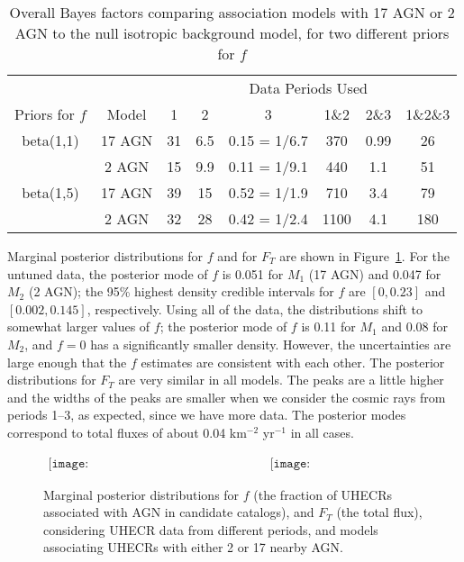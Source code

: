 \begin{table}
\begin{tabular}{|c|c|c |c| c| c| c| c|}
\hline
& & \multicolumn{6}{|c|}{Data Periods Used}\\
\cline{3-8}
 Priors for $f$ & Model & 1 &  2 &  3 &  1\&2 & 2\&3 &  1\&2\&3\\
\hline
beta(1,1) & 17 AGN & 31 & 6.5 & 0.15 = 1/6.7 & 370 & 0.99 & 26\\
 & 2 AGN  & 15 & 9.9 & 0.11 = 1/9.1 & 440 & 1.1 & 51\\
\hline
beta(1,5) & 17 AGN & 39 & 15 & 0.52 = 1/1.9 & 710 & 3.4 & 79\\
 & 2 AGN  & 32 & 28 & 0.42 = 1/2.4 & 1100 & 4.1 & 180\\
\hline
\end{tabular}
\caption{Overall Bayes factors comparing association models with 17 AGN or
2 AGN to the null isotropic background model, for two different priors for
$f$}\label{tab:BFtab}
\label{BFTable}
\end{table}


Marginal posterior distributions for $f$ and for $F_T$ are shown in
Figure~\ref{fig:posterior}.  For the untuned data, the posterior mode of
$f$ is 0.051 for $M_1$ (17 AGN) and 0.047 for $M_2$ (2 AGN);
the 95\% highest density credible intervals for $f$ are $[0, 0.23]$
and $[0.002, 0.145]$, respectively.  Using all of the data, the
distributions shift to somewhat larger values of $f$; the
posterior mode of $f$ is 0.11 for $M_1$ and 0.08 for $M_2$, and $f=0$
has a significantly smaller density.  However, the uncertainties are
large enough that the $f$ estimates are consistent with each other.  The
posterior distributions for $F_T$ are very similar in all models.  The
peaks are a little higher and the widths of the peaks are smaller when
we consider the cosmic rays from periods 1--3, as expected, since we
have more data.  The posterior modes correspond to total fluxes of about
0.04 km$^{-2}$ yr$^{-1}$ in all cases.

\begin{figure}
\centerline{$
\begin{array}{cc}
\texttt{[image: posterior\_f\_all\_margOverKappa.eps]} &
\texttt{[image: posterior\_FT\_all\_margOverKappa.eps]}
\end{array}$}
\caption{Marginal posterior distributions for $f$ (the fraction of
UHECRs associated with AGN in candidate catalogs), and $F_T$ (the total
flux), considering UHECR data from different periods, and models
associating UHECRs with either 2 or 17 nearby AGN.}
\label{fig:posterior}
\end{figure}



